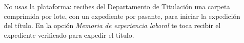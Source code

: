 \documentclass[11pt,a4paper]{article}
\begin{document}
{\small\tableofcontents}
\newpage
\begin{quevasahacer}
No usas la plataforma: recibes del Departamento de Titulación una carpeta comprimida por lote, con un expediente por pasante, para iniciar la expedición del título. En la opción \emph{Memoria de experiencia laboral} te toca recibir el expediente verificado para expedir el título.
\end{quevasahacer}



\end{document}
